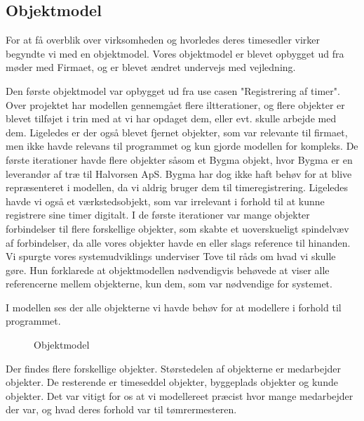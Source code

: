 \subsection{Objektmodel}

For at få overblik over virksomheden og hvorledes deres timesedler virker begyndte vi med en objektmodel. Vores objektmodel er blevet opbygget ud fra møder med Firmaet, og er blevet ændret undervejs med vejledning.

Den første objektmodel var opbygget ud fra use casen "Registrering af timer". Over projektet har modellen gennemgået flere iltterationer, og flere objekter er blevet tilføjet i trin med at vi har opdaget dem, eller evt. skulle arbejde med dem. Ligeledes er der også blevet fjernet objekter, som var relevante til firmaet, men ikke havde relevans til programmet og kun gjorde modellen for kompleks. De første iterationer havde flere objekter såsom et Bygma objekt, hvor Bygma er en leverandør af træ til Halvorsen ApS. Bygma har dog ikke haft behøv for at blive repræsenteret i modellen, da vi aldrig bruger dem til timeregistrering. Ligeledes havde vi også et værkstedsobjekt, som var irrelevant i forhold til at kunne registrere sine timer digitalt. I de første iterationer var mange objekter forbindelser til flere forskellige objekter, som skabte et uoverskueligt spindelvæv af forbindelser, da alle vores objekter havde en eller slags reference til hinanden. Vi spurgte vores systemudviklings underviser Tove til råds om hvad vi skulle gøre. Hun forklarede at objektmodellen nødvendigvis behøvede at viser alle referencerne mellem objekterne, kun dem, som var nødvendige for systemet.

I modellen ses der alle objekterne vi havde behøv for at modellere i forhold til programmet.

\begin{figure}[H]
    \caption{Objektmodel}
    \label{fig:BPMN2}
\end{figure}

Der findes flere forskellige objekter. Størstedelen af objekterne er medarbejder objekter. De resterende er timeseddel objekter, byggeplads objekter og kunde objekter. Det var vitigt for os at vi modellereet præcist hvor mange medarbejder der var, og hvad deres forhold var til tømrermesteren.